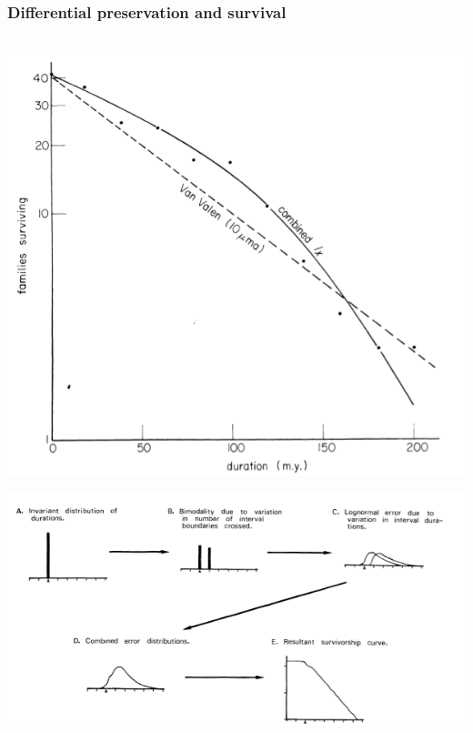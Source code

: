 \documentclass{beamer}
\begin{document}
\appendix

\begin{frame}
  \frametitle{Differential preservation and survival}

  \begin{columns}
    \begin{column}{0.5\textwidth}
      \begin{center}
        \includegraphics[height = 0.4\textheight, width = \textwidth, keepaspectratio = true]{figure/raup}

        \tiny{}

        \includegraphics[height = 0.4\textheight, width = \textwidth, keepaspectratio = true]{figure/sepkoski}


\end{center}
\end{column}
\end{columns}
\end{frame}
\end{document}
